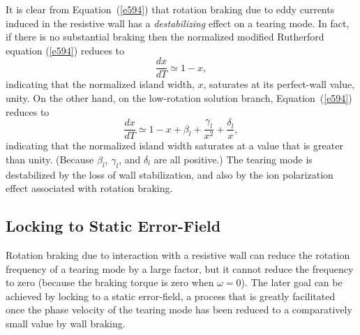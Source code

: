 \documentclass[notitlepage,12pt]{article}
\begin{document}
It is clear from Equation~(\ref{e594}) that rotation braking due to eddy currents induced in the
resistive wall has a {\em destabilizing}\/ effect on a tearing mode. In fact, if there is no
substantial braking then the normalized modified Rutherford equation (\ref{e594}) reduces to
\begin{equation}
\frac{dx}{dT} \simeq 1 - x,
\end{equation}
indicating that the normalized island width, $x$, saturates at its perfect-wall value, unity. On the other hand, on the low-rotation
solution branch, Equation~(\ref{e594}) reduces to
\begin{equation}\label{e606}
\frac{dx}{dT} \simeq 1 - x + \beta_l +\frac{\gamma_l}{x^2}+\frac{\delta_l}{x},
\end{equation}
indicating that the normalized island width saturates at a value that is greater than unity. (Because $\beta_l$, $\gamma_l$, and $\delta_l$ are all positive.) The tearing mode is
destabilized by the loss of wall stabilization, and also by the ion polarization effect associated with rotation braking. 

\subsection{Locking to Static Error-Field}\label{error}
Rotation braking due to interaction with a resistive wall can reduce the rotation frequency of a tearing mode
by a large factor, but it cannot reduce the frequency to zero (because the braking torque is zero when $\omega=0$).
The later goal can be achieved by locking to a static error-field, a process that is greatly facilitated once the phase
velocity of the tearing mode has been reduced to a comparatively small value by wall braking. 
\end{document}
